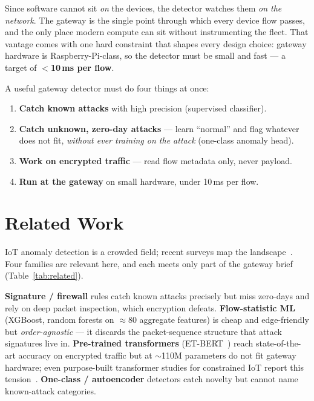 \documentclass[11pt,a4paper]{article}
\newcommand{\hd}[1]{\textbf{\textcolor{accent}{#1}}}
\begin{document}
Since software cannot sit \emph{on} the devices, the detector watches them
\emph{on the network}. The gateway is the single point through which every
device flow passes, and the only place modern compute can sit without
instrumenting the fleet. That vantage comes with one hard constraint that shapes
every design choice: gateway hardware is Raspberry-Pi-class, so the detector must
be small and fast --- a target of \textbf{$<$10\,ms per flow}.

\noindent A useful gateway detector must do four things at once:
\begin{enumerate}[leftmargin=1.4em,itemsep=1pt,topsep=2pt]
\item \hd{Catch known attacks} with high precision (supervised classifier).
\item \hd{Catch unknown, zero-day attacks} --- learn ``normal'' and flag whatever
does not fit, \emph{without ever training on the attack} (one-class anomaly head).
\item \hd{Work on encrypted traffic} --- read flow metadata only, never payload.
\item \hd{Run at the gateway} on small hardware, under 10\,ms per flow.
\end{enumerate}

\section{Related Work}

IoT anomaly detection is a crowded field; recent surveys map the
landscape~\cite{morshedi,survey23}. Four families are relevant here, and each
meets only part of the gateway brief (Table~\ref{tab:related}).

\hd{Signature / firewall} rules catch known attacks precisely but miss zero-days
and rely on deep packet inspection, which encryption defeats. \hd{Flow-statistic
ML} (XGBoost, random forests on $\approx$80 aggregate features) is cheap and
edge-friendly but \emph{order-agnostic} --- it discards the packet-sequence
structure that attack signatures live in. \hd{Pre-trained transformers}
(ET-BERT~\cite{etbert}) reach state-of-the-art accuracy on encrypted traffic but
at $\sim$110M parameters do not fit gateway hardware; even purpose-built
transformer studies for constrained IoT report this
tension~\cite{transformeriot}. \hd{One-class / autoencoder} detectors catch
novelty but cannot name known-attack categories.
\end{document}
